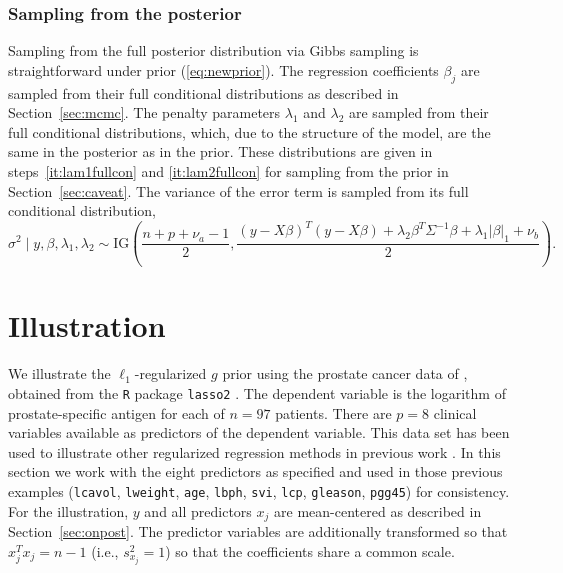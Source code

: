 \documentclass[12pt]{article}
\begin{document}
\subsubsection{Sampling from the posterior}\label{sec:newpost}
Sampling from the full posterior distribution via Gibbs sampling is straightforward 
under prior (\ref{eq:newprior}). The regression coefficients $\beta_j$ are sampled from
their full conditional distributions as described in Section~\ref{sec:mcmc}.
The penalty parameters $\lambda_1$ and $\lambda_2$ are sampled from their full
conditional distributions, which, due to the structure of the model, 
are the same in the posterior as in the prior. These distributions are given in 
steps~\ref{it:lam1fullcon} and \ref{it:lam2fullcon} for sampling from 
the prior in Section~\ref{sec:caveat}. The variance of the error term is sampled from 
its full conditional distribution,
\[
	\sigma^2 \mid y, \beta, \lambda_1, \lambda_2 \sim
	\mbox{IG}\left(\frac{n+p+\nu_a-1}{2},
		\frac{(y - X\beta)^T(y - X\beta) + \lambda_2 \beta^T \Sigma^{-1} \beta +
			\lambda_1 |\beta|_1 + \nu_b}{2}\right).
\]

\section{Illustration}\label{sec:illustration}
We illustrate the $\ell_1$-regularized $g$ prior using the prostate cancer data of 
\citet{stam:89}, obtained from the \texttt{R} package \texttt{lasso2} \citep{lokh:07}. 
The dependent variable is the logarithm of prostate-specific antigen for each of $n=97$ 
patients. There are $p=8$ clinical variables available as predictors of the dependent variable.
This data set has been used to illustrate other regularized regression methods in previous
work \citep[e.g.,][]{tibs:96, fu:98}. In this section we work with the eight predictors as 
specified and used in those previous examples (\texttt{lcavol}, \texttt{lweight}, 
\texttt{age}, \texttt{lbph}, \texttt{svi}, \texttt{lcp}, \texttt{gleason}, \texttt{pgg45}) 
for consistency. %
For the illustration, $y$ and all predictors $x_j$ 
are mean-centered as described in Section~\ref{sec:onpost}.  The predictor variables are 
additionally transformed so that $ x_j^T x_j = n-1$ (i.e., $s^2_{x_j} = 1$) so that the 
coefficients share a common scale. 
\end{document}

